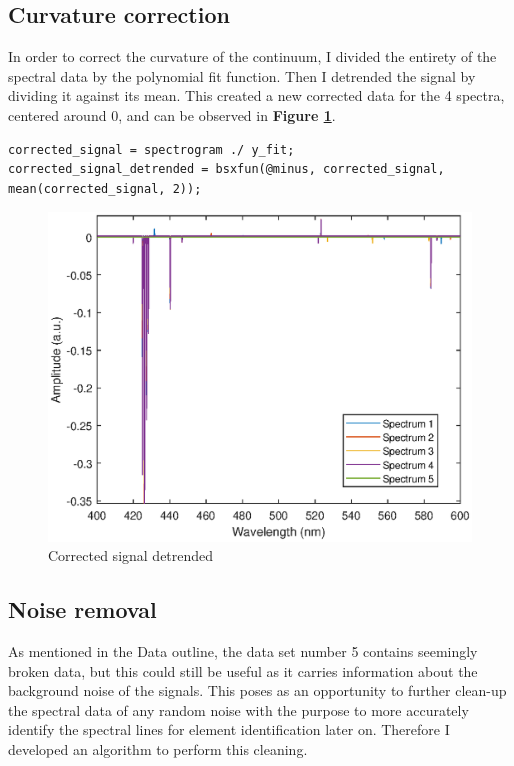 \subsection{Curvature correction}
In order to correct the curvature of the continuum, I divided the entirety of the spectral data by the polynomial fit function. Then I detrended the signal by dividing it against its mean. This created a new corrected data for the 4 spectra, centered around 0, and can be observed in \textbf{Figure \ref{fig:Figure 10}}.

\begin{lstlisting}
corrected_signal = spectrogram ./ y_fit;
corrected_signal_detrended = bsxfun(@minus, corrected_signal, mean(corrected_signal, 2));
\end{lstlisting}

\begin{figure}[H]
    \centering
    \includegraphics[width = 1\textwidth ]{figures/correctedSignal_detrended.eps}
    \caption{Corrected signal detrended}
    \label{fig:Figure 10}
\end{figure}

\subsection{Noise removal}
As mentioned in the Data outline, the data set number 5 contains seemingly broken data, but this could still be useful as it carries information about the background noise of the signals. This poses as an opportunity to further clean-up the spectral data of any random noise with the purpose to more accurately identify the spectral lines for element identification later on. Therefore I developed an algorithm to perform this cleaning.


